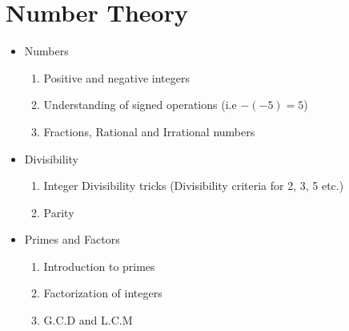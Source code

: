 \documentclass[oneside]{book}
\begin{document}
\section{Number Theory}
\begin{itemize}
  \item Numbers
    \begin{enumerate}
        \item Positive and negative integers
        \item Understanding of signed operations (i.e $-(-5) = 5$)
        \item Fractions, Rational and Irrational numbers
    \end{enumerate}
  \item Divisibility
    \begin{enumerate}
      \item Integer Divisibility tricks (Divisibility criteria for 2, 3, 5 etc.)
      \item Parity
  \end{enumerate}
  \item Primes and Factors
    \begin{enumerate}
      \item Introduction to primes
      \item Factorization of integers
      \item G.C.D and L.C.M
  \end{enumerate}
\end{itemize}
\end{document}
